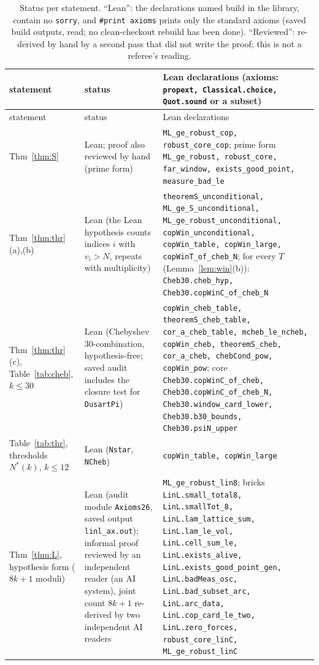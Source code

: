 \documentclass[11pt]{article}
\theoremstyle{definition}
\theoremstyle{remark}
\begin{document}
{\footnotesize
\setlength{\tabcolsep}{4pt}
\begin{longtable}{@{}p{}p{}p{}@{}}
\caption{Status per statement. ``Lean'': the declarations named build in the library, contain no \texttt{sorry}, and \texttt{\#print axioms} prints only the standard axioms (saved build outputs, read; no clean-checkout rebuild has been done). ``Reviewed'': re-derived by hand by a second pass that did not write the proof; this is not a referee's reading.}\label{tab:status}\\
\toprule
statement & status & Lean declarations (axioms: \texttt{propext, Classical.choice, Quot.sound} or a subset) \\
\midrule
\endfirsthead
\toprule
statement & status & Lean declarations \\
\midrule
\endhead
\bottomrule
\endfoot
Thm~\ref{thm:S} & Lean; proof also reviewed by hand (prime form) & \texttt{ML\_ge\_robust\_cop, robust\_core\_cop}; prime form \texttt{ML\_ge\_robust, robust\_core, far\_window, exists\_good\_point, measure\_bad\_le} \\
Thm~\ref{thm:thr}(a),(b) & Lean (the Lean hypothesis counts indices $i$ with $v_i>N$, repeats with multiplicity) & \texttt{theoremS\_unconditional, ML\_ge\_S\_unconditional, ML\_ge\_robust\_unconditional, copWin\_unconditional, copWin\_table, copWin\_large, copWinT\_of\_cheb\_N}; for every $T$ (Lemma~\ref{lem:win}(b)): \texttt{Cheb30.cheb\_hyp, Cheb30.copWinC\_of\_cheb\_N} \\
Thm~\ref{thm:thr}(c), Table~\ref{tab:cheb}, $k\le30$ & Lean (Chebyshev 30-combination, hypothesis-free; saved audit includes the closure test for \texttt{DusartPi}) & \texttt{copWin\_cheb\_table, theoremS\_cheb\_table, cor\_a\_cheb\_table, mcheb\_le\_ncheb, copWin\_cheb, theoremS\_cheb, cor\_a\_cheb, chebCond\_pow, copWin\_pow}; core \texttt{Cheb30.copWinC\_of\_cheb, Cheb30.copWinC\_of\_cheb\_N, Cheb30.window\_card\_lower, Cheb30.b30\_bounds, Cheb30.psiN\_upper} \\
Table~\ref{tab:thr}, thresholds $N^*(k)$, $k\le12$ & Lean (\texttt{Nstar}, \texttt{NCheb}) & \texttt{copWin\_table, copWin\_large} \\
Thm~\ref{thm:L}, hypothesis form ($8k+1$ moduli) & Lean (audit module \texttt{Axioms26}, saved output \texttt{linl\_ax.out}); informal proof reviewed by an independent reader (an AI system), joint count $8k+1$ re-derived by two independent AI readers & \texttt{ML\_ge\_robust\_lin8}; bricks \texttt{LinL.small\_total8, LinL.smallTot\_8, LinL.lam\_lattice\_sum, LinL.lam\_le\_vol, LinL.cell\_sum\_le, LinL.exists\_alive, LinL.exists\_good\_point\_gen, LinL.badMeas\_osc, LinL.bad\_subset\_arc, LinL.arc\_data, LinL.cop\_card\_le\_two, LinL.zero\_forces, robust\_core\_linC, ML\_ge\_robust\_linC} \\

\end{longtable}}
\end{document}
